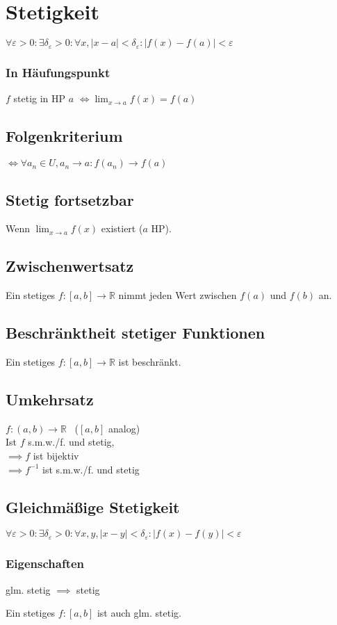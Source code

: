 \section*{Stetigkeit}

$\forall \varepsilon>0: \exists \delta_\varepsilon>0: \forall x, |x-a|<\delta_\varepsilon: |f(x)-f(a)|<\varepsilon$

\subsubsection*{In Häufungspunkt}
$f$ stetig in HP $a$ $\displaystyle \iff \lim_{x\to a}f(x)=f(a)$

\subsection*{Folgenkriterium}
$\iff \forall a_n \in U, a_n\to a: f(a_n)\to f(a)$

\subsection*{Stetig fortsetzbar}
Wenn $\displaystyle \lim_{x\to a}f(x)$ existiert ($a$ HP).

\subsection*{Zwischenwertsatz}
Ein stetiges $f: [a,b]\to\mathbb{R}$ nimmt jeden Wert zwischen $f(a)$ und $f(b)$ an.

\subsection*{Beschränktheit stetiger Funktionen}
Ein stetiges $f: [a,b]\to\mathbb{R}$ ist beschränkt.

\subsection*{Umkehrsatz}
$f:(a,b)\to\mathbb{R}$ ~($[a,b]$ analog) \\
Ist $f$ s.m.w./f. und stetig, \\
$\implies f$ ist bijektiv \\
$\implies f^{-1}$ ist s.m.w./f. und stetig

\subsection*{Gleichmäßige Stetigkeit}
$\forall \varepsilon>0: \exists \delta_\varepsilon>0: \forall x,y,|x-y|<\delta_\varepsilon:|f(x)-f(y)|<\varepsilon$

\subsubsection*{Eigenschaften}
glm. stetig $\implies$ stetig

Ein stetiges $f: [a,b]$ ist auch glm. stetig.
